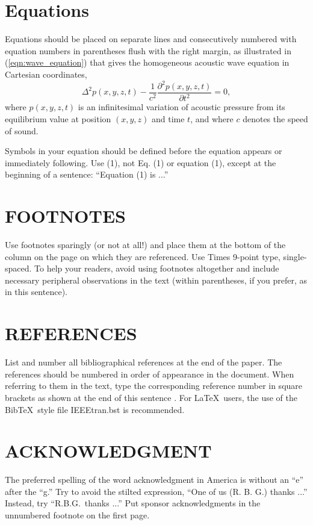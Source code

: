\documentclass{article}
\begin{document}
\begin{sloppy}
\section{Equations}
\label{sec:equations}

Equations should be placed on separate lines and consecutively
numbered with equation numbers in parentheses flush with the 
right margin, as illustrated in (\ref{eqn:wave_equation}) 
that gives the homogeneous acoustic wave equation in
Cartesian coordinates,
\begin{equation}
  \label{eqn:wave_equation}
    \Delta^2p(x,y,z,t)-
    \displaystyle\frac{1}{c^2}\frac{\partial^2p(x,y,z,t)}{\partial t^2}=0,
\end{equation}
where $p(x,y,z,t)$ is an infinitesimal variation of acoustic 
pressure from its equilibrium value at position $(x,y,z)$ and 
time $t$, and where $c$ denotes the speed of sound.

Symbols in your equation should be defined before the equation 
appears or immediately following.  Use (1), not Eq. (1) or 
equation (1), except at the beginning of a sentence:  
``Equation (1) is ...''



\section{FOOTNOTES}
\label{sec:foot}

Use footnotes sparingly (or not at all!) and place them at 
the bottom of the column on the page on which they are 
referenced. Use Times 9-point type, single-spaced. To 
help your readers, avoid using footnotes altogether and
include necessary peripheral observations in the text 
(within parentheses, if you prefer, as in this sentence).


\section{REFERENCES}
\label{sec:ref}

List and number all bibliographical references at the end 
of the paper. The references should be numbered in order 
of appearance in the document. When referring to them in 
the text, type the corresponding reference number in 
square brackets as shown at the end of this sentence . For \LaTeX\ users, 
the use of the Bib\TeX\ style file IEEEtran.bst is 
recommended.

\section{ACKNOWLEDGMENT}
\label{sec:ack}

The preferred spelling of the word acknowledgment in 
America is without an ``e'' after the ``g.'' Try to avoid 
the stilted expression, ``One of us (R. B. G.) thanks ...''
Instead, try ``R.B.G.\ thanks ...''  Put sponsor 
acknowledgments in the unnumbered footnote on the first page.





\end{sloppy}
\end{document}
